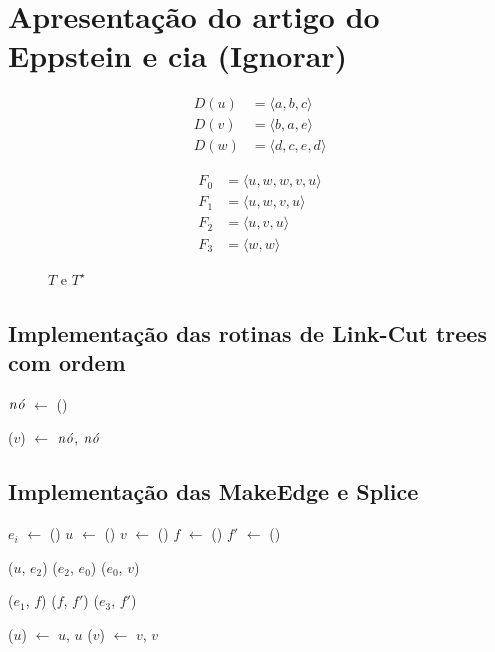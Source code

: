 \section{Apresentação do artigo do Eppstein e cia (Ignorar)}


\begin{align*}
D(u) &= \langle a, b, c\rangle \\
D(v) &= \langle b, a, e\rangle \\
D(w) &= \langle d, c, e, d\rangle
\end{align*}

\begin{align*}
F_0 &= \langle u, w, w, v, u\rangle \\
F_1 &= \langle u, w, v, u\rangle \\
F_2 &= \langle u, v, u\rangle\\
F_3 &= \langle w, w\rangle
\end{align*}


\begin{figure}[htb]
\centering

\caption{$T$ e $T^\star$}
\label{fig:MSF-figura-3}
\end{figure}



\subsection{Implementação das rotinas de Link-Cut trees com ordem}


\begin{algorithm}[htb]
\caption{\LCOMakeNode($v$)}
\label{Algo:LCOMakeNode}
\begin{algorithmic}[1]

\State $\mathit{n\acute{o}}$ $\gets$ \linkcutCreate()

\State \hashNP($v$) $\gets$ $\mathit{n\acute{o}}$, $\mathit{n\acute{o}}$

\end{algorithmic}
\end{algorithm}


\subsection{Implementação das MakeEdge e Splice}

\begin{algorithm}[htb]
\caption{\LCOMakeEdge()}
\label{Algo:LCOMakeEdges}
\begin{algorithmic}[1]
\State $e_i$ $\gets$ \linkcutCreate()
\EndFor
\State $u$ $\gets$ \linkcutCreate()
\State $v$ $\gets$ \linkcutCreate()
\State $f$ $\gets$ \linkcutCreate()
\State $f'$ $\gets$ \linkcutCreate()

\State \linkcutAddEdge($u$, $e_2$)
\State \linkcutAddEdge($e_2$, $e_0$)
\State \linkcutAddEdge($e_0$, $v$)


\State \linkcutAddEdge($e_1$, $f$)
\State \linkcutAddEdge($f$, $f'$)
\State \linkcutAddEdge($e_3$, $f'$)


\State \hashNP($u$) $\gets$ $u$, $u$
\State \hashNP($v$) $\gets$ $v$, $v$

\end{algorithmic}
\end{algorithm}

